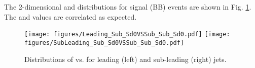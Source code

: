 
The 2-dimensional \subsdzero and \subsubsdzero distributions for signal (BB) events are shown in Fig. \ref{fig:subsd0vssubsubsd0}. The \subsdzero and \subsubsdzero values are correlated as expected. 

\begin{figure}[htbp]
  \centering
   \texttt{[image: figures/Leading\_Sub\_Sd0VSSub\_Sub\_Sd0.pdf]}
    \texttt{[image: figures/SubLeading\_Sub\_Sd0VSSub\_Sub\_Sd0.pdf]}
    \caption{Distributions of \subsdzero vs. \subsubsdzero for leading (left) and sub-leading (right) jets.}
  \label{fig:subsd0vssubsubsd0}
\end{figure}


